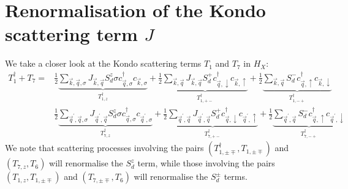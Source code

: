 \documentclass{revtex4-2}
\begin{document}
\section{Renormalisation of the Kondo scattering term \(J\)}
We take a closer look at the Kondo scattering terms \(T_1\) and \(T_7\) in \(H_X\):
\begin{equation}\begin{aligned}
	T_1^\dagger + T_7 =& \frac{1}{2}\underbrace{\sum_{\vec k,\vec q,\sigma}J_{\vec k,\vec q}S_d^z \sigma c^\dagger_{\vec q,\sigma} c_{\vec k,\sigma}}_{T_{1,z}^\dagger} + \frac{1}{2}\underbrace{\sum_{\vec k,\vec q}J_{\vec k,\vec q} S_d^+ c^\dagger_{\vec q,\downarrow} c_{\vec k,\uparrow}}_{T_{1,+-}^\dagger} + \frac{1}{2}\underbrace{\sum_{\vec k,\vec q}S_d^- c^\dagger_{\vec q,\uparrow} c_{\vec k,\downarrow}}_{T_{1,-+}^\dagger} \\
			   &\frac{1}{2}\underbrace{\sum_{\vec q^\prime,\vec q,\sigma}J_{\vec q^\prime,\vec q}S_d^z \sigma c^\dagger_{\vec q,\sigma} c_{\vec q^\prime,\sigma}}_{T_{7,z}^\dagger} + \frac{1}{2}\underbrace{\sum_{\vec q^\prime,\vec q}J_{\vec q^\prime,\vec q} S_d^+ c^\dagger_{\vec q,\downarrow} c_{\vec q^\prime,\uparrow}}_{T_{7,+-}^\dagger} + \frac{1}{2}\underbrace{\sum_{\vec q^\prime,\vec q}S_d^- c^\dagger_{\vec q,\uparrow} c_{\vec q^\prime,\downarrow}}_{T_{7,-+}^\dagger}
\end{aligned}\end{equation}
We note that scattering processes involving the pairs \(\left(T_{1,\pm \mp}^\dagger, T_{1,\pm \mp}\right)\) and \(\left(T_{7,z}, T_6\right) \) will renormalise the \(S_d^z\) term, while those involving the pairs \(\left(T_{1,z}, T_{1,\pm \mp}\right)\) and \(\left(T_{7,\pm \mp}, T_6\right)\) will renormalise the \(S_d^\pm\) terms. 
\end{document}
